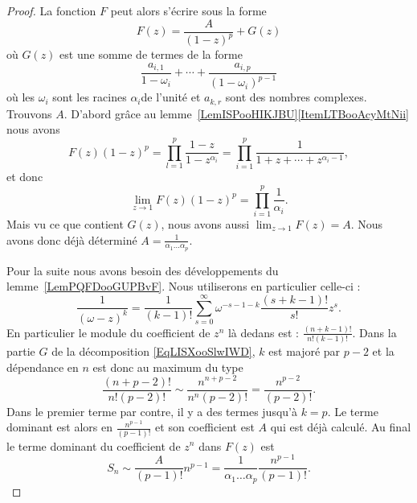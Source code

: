 \begin{proof}
    La fonction \( F\) peut alors s'écrire sous la forme
    \begin{equation}    \label{EqLISXooSlwIWD}
        F(z)=\frac{ A }{ (1-z)^p }+G(z)
    \end{equation}
    où \( G(z)\) est une somme de termes de la forme
    \begin{equation}
        \frac{ a_{i,1} }{ 1-\omega_i }+\cdots +\frac{ a_{i,p} }{ (1-\omega_i)^{p-1} }
    \end{equation}
    où les \( \omega_i\) sont les racines \( \alpha_i\)\ieme de l'unité et \( a_{k,r}\) sont des nombres complexes. Trouvons \( A\). D'abord grâce au lemme~\ref{LemISPooHIKJBU}\ref{ItemLTBooAcyMtNii} nous avons
    \begin{equation}
        F(z)(1-z)^p=\prod_{l=1}^p\frac{ 1-z }{ 1-z^{\alpha_i} }=\prod_{i=1}^p\frac{ 1 }{ 1+z+\cdots +z^{\alpha_i-1} },
    \end{equation}
    et donc
    \begin{equation}
        \lim_{z\to 1}F(z)(1-z)^p=\prod_{i=1}^p\frac{1}{ \alpha_i }.
    \end{equation}
    Mais vu ce que contient \( G(z)\), nous avons aussi \( \lim_{z\to 1}F(z)=A\). Nous avons donc déjà déterminé \( A=\frac{1}{  \alpha_1\ldots\alpha_p }\).

    Pour la suite nous avons besoin des développements du lemme~\ref{LemPQFDooGUPBvF}. Nous utiliserons en particulier celle-ci :
    \begin{equation}
        \frac{1}{ (\omega-z)^k }=\frac{1}{ (k-1)! }\sum_{s=0}^{\infty}\omega^{-s-1-k}\frac{ (s+k-1)! }{ s! }z^s.
    \end{equation}
    En particulier le module du coefficient de \( z^n\) là dedans est : \(  \frac{(n+k-1)! }{ n!(k-1)! } \). Dans la partie \( G\) de la décomposition \eqref{EqLISXooSlwIWD}, \( k\) est majoré par \( p-2\) et la dépendance en \( n\) est donc au maximum du type
    \begin{equation}
        \frac{ (n+p-2)! }{ n!(p-2)! }\sim  \frac{ n^{n+p-2} }{ n^n(p-2)! }=\frac{ n^{p-2} }{ (p-2)! }.
    \end{equation}
    Dans le premier terme par contre, il y a des termes jusqu'à \( k=p\). Le terme dominant est alors en \( \frac{ n^{p-1} }{ (p-1)! }\) et son coefficient est \( A\) qui est déjà calculé. Au final le terme dominant du coefficient de \( z^n\) dans \( F(z)\) est
    \begin{equation}
        S_n\sim \frac{ A }{ (p-1)! }n^{p-1}=\frac{1}{ \alpha_1\ldots \alpha_p }\frac{ n^{p-1} }{ (p-1)! }.
    \end{equation}
\end{proof}

